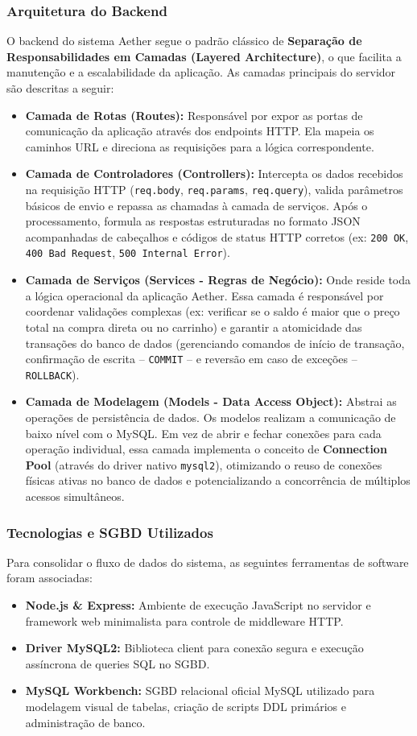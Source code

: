 \documentclass[12pt,a4paper]{article}
\begin{document}
\subsubsection{Arquitetura do Backend}
O backend do sistema Aether segue o padrão clássico de \textbf{Separação de Responsabilidades em Camadas (Layered Architecture)}, o que facilita a manutenção e a escalabilidade da aplicação. As camadas principais do servidor são descritas a seguir:
\begin{itemize}
    \item \textbf{Camada de Rotas (Routes):} Responsável por expor as portas de comunicação da aplicação através dos endpoints HTTP. Ela mapeia os caminhos URL e direciona as requisições para a lógica correspondente.
    \item \textbf{Camada de Controladores (Controllers):} Intercepta os dados recebidos na requisição HTTP (\texttt{req.body}, \texttt{req.params}, \texttt{req.query}), valida parâmetros básicos de envio e repassa as chamadas à camada de serviços. Após o processamento, formula as respostas estruturadas no formato JSON acompanhadas de cabeçalhos e códigos de status HTTP corretos (ex: \texttt{200 OK}, \texttt{400 Bad Request}, \texttt{500 Internal Error}).
    \item \textbf{Camada de Serviços (Services - Regras de Negócio):} Onde reside toda a lógica operacional da aplicação Aether. Essa camada é responsável por coordenar validações complexas (ex: verificar se o saldo é maior que o preço total na compra direta ou no carrinho) e garantir a atomicidade das transações do banco de dados (gerenciando comandos de início de transação, confirmação de escrita -- \texttt{COMMIT} -- e reversão em caso de exceções -- \texttt{ROLLBACK}).
    \item \textbf{Camada de Modelagem (Models - Data Access Object):} Abstrai as operações de persistência de dados. Os modelos realizam a comunicação de baixo nível com o MySQL. Em vez de abrir e fechar conexões para cada operação individual, essa camada implementa o conceito de \textbf{Connection Pool} (através do driver nativo \texttt{mysql2}), otimizando o reuso de conexões físicas ativas no banco de dados e potencializando a concorrência de múltiplos acessos simultâneos.
\end{itemize}

\subsubsection{Tecnologias e SGBD Utilizados}
Para consolidar o fluxo de dados do sistema, as seguintes ferramentas de software foram associadas:
\begin{itemize}
    \item \textbf{Node.js \& Express:} Ambiente de execução JavaScript no servidor e framework web minimalista para controle de middleware HTTP.
    \item \textbf{Driver MySQL2:} Biblioteca client para conexão segura e execução assíncrona de queries SQL no SGBD.
    \item \textbf{MySQL Workbench:} SGBD relacional oficial MySQL utilizado para modelagem visual de tabelas, criação de scripts DDL primários e administração de banco.
\end{itemize}
\end{document}
